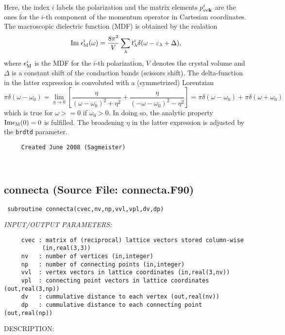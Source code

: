 \documentclass[11pt]{article}
\begin{document}
     Here, the index $i$ labels the polarization and the matrix elements
     $p^{i}_{vc{\bf k}}$ are the ones for the $i$-th component of the momentum
     operator in Cartesian coordinates.
     The macroscopic dielectric function (MDF) is obtained by the realation
     $$ {\rm Im}\; \epsilon^{i}_{\rm M}(\omega) = \frac{8\pi^2}{V} 
                       \sum_{\lambda} t^{i}_{\lambda}
                       \delta(\omega-\varepsilon_{\lambda}+\Delta),$$
     where $\epsilon^{i}_{\rm M}$ is the MDF for the $i$-th polarization, $V$
     denotes the crystal volume and $\Delta$ is a constant shift of the
     conduction bands (scissors shift). The delta-function in the latter
     expression is convoluted with a (symmetrized) Lorentzian 
     $$ \pi\delta(\omega-\omega_0) = \lim_{\eta\rightarrow 0} \left[
                           \frac{\eta}{(\omega-\omega_0)^2+\eta^2} +
                           \frac{\eta}{(-\omega-\omega_0)^2-\eta^2} \right] =
       \pi\delta(\omega-\omega_0) +  \pi\delta(\omega+\omega_0)       $$
     which is true for $\omega>=0$ if $\omega_0>0$. In doing so, the analytic
     property ${\rm Im}\epsilon_{\rm M}(0)=0$ is fulfilled.
     The broadening $\eta$ in the latter expression is adjusted by the
     {\tt brdtd} parameter.
  
\begin{verbatim}     Created June 2008 (Sagmeister)\end{verbatim}






 
 
\mbox{}\hrulefill\ 
 
\subsection{connecta (Source File: connecta.F90)}


\begin{verbatim} subroutine connecta(cvec,nv,np,vvl,vpl,dv,dp)\end{verbatim}{\em INPUT/OUTPUT PARAMETERS:}
\begin{verbatim}     cvec : matrix of (reciprocal) lattice vectors stored column-wise
           (in,real(3,3))
     nv   : number of vertices (in,integer)
     np   : number of connecting points (in,integer)
     vvl  : vertex vectors in lattice coordinates (in,real(3,nv))
     vpl  : connecting point vectors in lattice coordinates (out,real(3,np))
     dv   : cummulative distance to each vertex (out,real(nv))
     dp   : cummulative distance to each connecting point (out,real(np))\end{verbatim}
{\sf DESCRIPTION:\\ }
\end{document}
